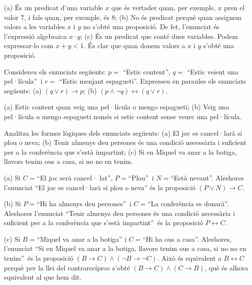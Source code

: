\begin{solucio}
(a) És un predicat d'una variable $x$ que és vertader quan, per
exemple, $x$ pren el valor $7$, i fals quan, per exemple, és $8$; (b) No
és predicat perquè quan assignem valors a les variables $x$ i $y$ no
s'obté una proposició. De fet, l'enunciat és l'expressió
algebraica $x\cdot y$; (c) És un predicat que conté dues variables.
Podem expressar-lo com $x+y<1$. És clar que quan donem valors a $x$ i $y$
s'obté una proposició.
\end{solucio}

\begin{exercici}
Considereu els enunciats següents: $p=$ \enquote{Estic
content}, $q=$ \enquote{Estic veient una
pel·lícula}\ i $r=$ \enquote{Estic menjant espagueti}. Expresseu en paraules els enunciats
següents: (a) $\left(  q\vee r\right)  \longrightarrow p$; (b) $\left(
p\wedge\lnot q\right)  \longleftrightarrow\left(  q\vee r\right)  $.
\end{exercici}

\begin{solucio}
(a) Estic content quan veig una pel·lícula o mengo
espagueti; (b) Veig una pel·lícula o mengo espagueti
només si estic content sense veure una pel·lícula.
\end{solucio}

\begin{exercici}
Analitza les formes lògiques dels enunciats següents: (a) El joc es
cancel·larà si plou o neva; (b) Tenir almenys deu
persones és una condició necessària i suficient per a la
conferència que s'està impartint; (c) Si en Miquel va anar a la
botiga, llavors tenim ous a casa, si no no en tenim.
\end{exercici}

\begin{solucio}
(a) Si $C=$\enquote{El joc serà cancel·
lat}, $P=$\enquote{Plou}\ i
$N=$\enquote{Està nevant}. Aleshores l'enunciat \enquote{El joc es cancel·larà si plou o neva} és la proposició $(P\vee N)\longrightarrow C$.

(b) Si $P=$\enquote{Hi ha almenys deu persones}\ i
$C=$\enquote{La conferència es donarà}.
Aleshores l'enunciat \enquote{Tenir almenys deu persones és una
condició necessària i suficient per a la conferència que
s'està impartint}\ és la proposició
$P\longleftrightarrow C$.

(c) Si $B=$\enquote{Miquel va anar a la botiga} i
$C=$\enquote{Hi ha ous a casa}. Aleshores, l'enunciat
\enquote{Si en Miquel va anar a la botiga, llavors tenim ous a casa,
si no no en tenim}\ és la proposició $(B\rightarrow
C)\wedge(\lnot B\rightarrow\lnot C)$. Això és equivalent a
$B\longleftrightarrow C$ perquè per la llei del contrarecíproc
s'obté $(B\rightarrow C)\wedge(C\rightarrow B)$, què és alhora
equivalent al que hem dit.
\end{solucio}

